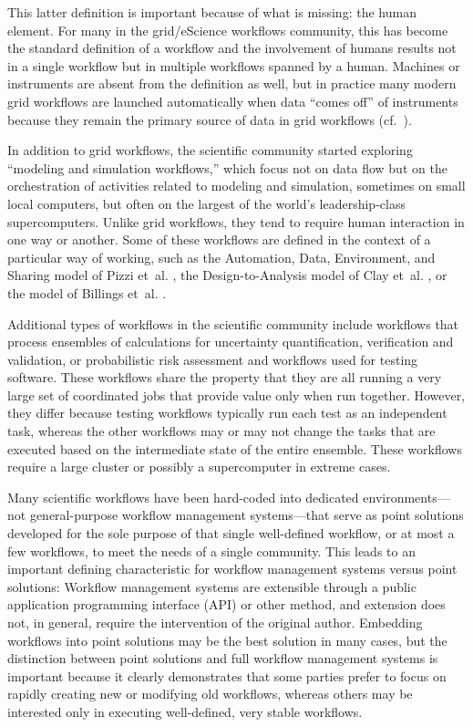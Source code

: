 This latter definition is important because of what is missing: the human
element. For many in the grid/eScience workflows community, this has become the
standard definition of a workflow and the involvement of humans results not in a
single workflow but in multiple workflows spanned by a human.  Machines or
instruments are absent from the definition as well, but in practice many modern
grid workflows are launched automatically when data ``comes off'' of instruments
because they remain the primary source of data in grid workflows
(cf.~\cite{megino_panda:_2015}).

In addition to grid workflows, the scientific community started exploring
``modeling and simulation workflows,'' which focus not on data flow but on the
orchestration of activities related to modeling and simulation,
sometimes on small local computers, but often on the largest of the world's
leadership-class supercomputers. Unlike grid workflows, they tend to require
human interaction in one way or another.  Some of these workflows are defined
in the context of a particular way of working, such as the Automation, Data,
Environment, and Sharing model of Pizzi et~al. \cite{pizzi_aiida:_2016}, the
Design-to-Analysis model of Clay et~al. \cite{clay_incorporating_2015}, or the
model of Billings et~al. \cite{billings_eclipse_2017}.

Additional types of workflows in the scientific community include workflows that
process ensembles of calculations for uncertainty quantification, verification
and validation, or probabilistic risk assessment \cite{montoya_apex_2016} and
workflows used for testing software. These workflows share the property
that they are all running a very large set of coordinated jobs that provide
value only when run together. However, they differ because testing workflows
typically run each test as an independent task, whereas the other workflows may
or may not change the tasks that are executed based on the intermediate state of
the entire ensemble. These workflows require a large cluster or possibly a
supercomputer in extreme cases.

Many scientific workflows have been hard-coded into dedicated environments---not
general-purpose workflow management systems---that serve as point solutions
developed for the sole purpose of that single well-defined workflow, or at most
a few workflows, to meet the needs of a single community. This leads to an
important defining characteristic for workflow management systems versus
point solutions: Workflow management systems are extensible through a public
application programming interface (API) or other method, and extension does not,
in general, require the intervention of the original author. Embedding workflows
into point solutions may be the best solution in many cases, but the
distinction between point solutions and full workflow management systems is
important because it clearly demonstrates  that some parties prefer to focus on
rapidly creating new or modifying old workflows, whereas others may be
interested only in executing well-defined, very stable workflows.

